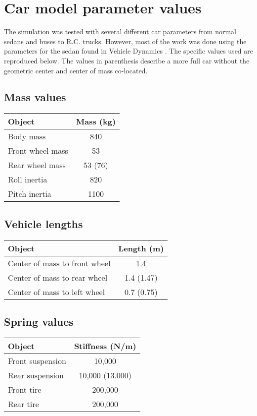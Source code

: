 \section{Car model parameter values}
The simulation was tested with several different car parameters from normal sedans and buses to R.C. trucks. However, most of the work was done using the parameters for the sedan found in Vehicle Dynamics \cite{book:jazar}. The specific values used are reproduced below. The values in parenthesis describe a more full car without the geometric center and center of mass co-located.

\subsection{Mass values}
\begin{center}
\begin{tabular}{| l | c |}
\hline
Object & Mass (kg) \\
\hline
Body mass & 840 \\
Front wheel mass & 53 \\
Rear wheel mass & 53 (76) \\
Roll inertia & 820 \\
Pitch inertia & 1100 \\
\hline
\end{tabular}
\end{center}


\subsection{Vehicle lengths}
\begin{center}
\begin{tabular}{| l | c |}
\hline
Object & Length (m) \\
\hline
Center of mass to front wheel & 1.4 \\
Center of mass to rear wheel & 1.4 (1.47) \\
Center of mass to left wheel & 0.7 (0.75) \\
\hline
\end{tabular}
\end{center}

\subsection{Spring values}
\begin{center}
\begin{tabular}{| l | c |}
\hline
Object & Stiffness (N/m) \\
\hline
Front suspension & 10,000 \\
Rear suspension & 10,000 (13.000) \\
Front tire & 200,000 \\
Rear tire & 200,000 \\
\hline
\end{tabular}
\end{center}

